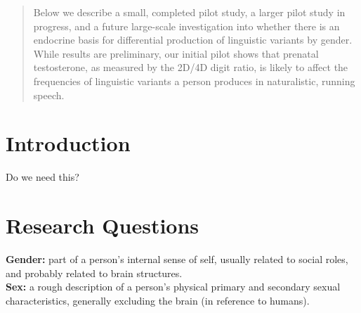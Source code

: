 \documentclass[a0,portrait]{a0poster}
\begin{document}
\begin{multicols}{2} %


\color{Navy} %

\begin{abstract}

Below we describe a small, completed pilot study, a larger pilot study in progress, and a future large-scale investigation into whether there is an endocrine basis for differential production of linguistic variants by gender. While results are preliminary, our initial pilot shows that prenatal testosterone, as measured by the 2D/4D digit ratio, is likely to affect the frequencies of linguistic variants a person produces in naturalistic, running speech.

\end{abstract}


\color{SaddleBrown} %

\section*{Introduction}

Do we need this?

\color{DarkSlateGray} %

\section*{Research Questions}

\textbf{Gender:} part of a person's internal sense of self, usually related to social roles, and probably related to brain structures.\\
\textbf{Sex:} a rough description of a person's physical primary and secondary sexual characteristics, generally excluding the brain (in reference to humans).


\end{multicols}
\end{document}
